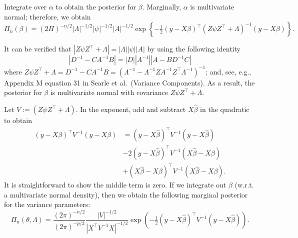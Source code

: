\documentclass[
]{book}
\begin{document}
Integrate over \(\alpha\) to obtain the posterior for \(\beta\). Marginally, \(\alpha\) is multivariate normal; therefore, we obtain
\[\Pi_n(\beta) = (2\Pi)^{-n/2}|\Lambda|^{-1/2}|\psi|^{-1/2}|A|^{-1/2}\exp\left\{-\tfrac12 \left(y - X\beta\right)^\top (Z\psi Z^\top +\Lambda)^{-1}(y - X\beta)\right\}.\]

It can be verified that \(|Z\psi Z^\top +\Lambda| = |\Lambda||\psi||A|\) by using the following identity
\[|D^{-1} - CA^{-1}B| = |D||A^{-1}||A - BD^{-1}C|\]
where \(Z\psi Z^\top +\Lambda = D^{-1} - CA^{-1}B = (\Lambda^{-1} - \Lambda^{-1}ZA^{-1}Z^\top \Lambda^{-1})^{-1}\); and, see, e.g., Appendix M equation 31 in Searle et al.~(Variance Components). As a result, the posterior for \(\beta\) is multivariate normal with covariance \(Z\psi Z^\top +\Lambda\).

Let \(V := (Z\psi Z^\top +\Lambda)\). In the exponent, add and subtract \(X\hat\beta\) in the quadratic to obtain
\begin{align*}
\left(y - X\beta\right)^\top V^{-1}(y - X\beta) & = \left(y - X\hat\beta\right)^\top V^{-1}(y - X\hat\beta)\\
& -2 \left(y - X\hat\beta\right)^\top V^{-1}(X\hat\beta - X\beta)\\
& + \left(X\hat\beta - X\beta\right)^\top V^{-1}(X\hat\beta - X\beta).
\end{align*}
It is straightforward to show the middle term is zero. If we integrate out \(\beta\) (w.r.t. a multivariate normal density), then we obtain the following marginal posterior for the variance parameters:
\[\Pi_n(\theta, \Lambda) = \frac{(2\pi)^{-n/2}}{(2\pi)^{-p/2}}\frac{|V|^{-1/2}}{|X^\top V^{-1}X|^{-1/2}}\exp\left(-\tfrac12 \left(y - X\hat\beta\right)^\top V^{-1}(y - X\hat\beta)\right).\]

  
\end{document}
